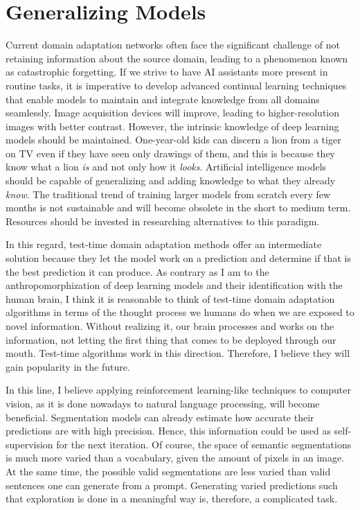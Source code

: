 
\section{Generalizing Models}
Current domain adaptation networks often face the significant challenge of not retaining information about the source domain, leading to a phenomenon known as catastrophic forgetting. If we strive to have AI assistants more present in routine tasks, it is imperative to develop advanced continual learning techniques that enable models to maintain and integrate knowledge from all domains seamlessly. Image acquisition devices will improve, leading to higher-resolution images with better contrast. However, the intrinsic knowledge of deep learning models should be maintained. One-year-old kids can discern a lion from a tiger on TV even if they have seen only drawings of them, and this is because they know what a lion \textit{is} and not only how it \textit{looks}. Artificial intelligence models should be capable of generalizing and adding knowledge to what they already \textit{know}. The traditional trend of training larger models from scratch every few months is not sustainable and will become obsolete in the short to medium term. Resources should be invested in researching alternatives to this paradigm.

In this regard, test-time domain adaptation methods offer an intermediate solution because they let the model work on a prediction and determine if that is the best prediction it can produce. As contrary as I am to the anthropomorphization of deep learning models and their identification with the human brain, I think it is reasonable to think of test-time domain adaptation algorithms in terms of the thought process we humans do when we are exposed to novel information. Without realizing it, our brain processes and works on the information, not letting the first thing that comes to be deployed through our mouth. Test-time algorithms work in this direction. Therefore, I believe they will gain popularity in the future.

In this line, I believe applying reinforcement learning-like techniques to computer vision, as it is done nowadays to natural language processing, will become beneficial. Segmentation models can already estimate how accurate their predictions are with high precision. Hence, this information could be used as self-supervision for the next iteration. Of course, the space of semantic segmentations is much more varied than a vocabulary, given the amount of pixels in an image. At the same time, the possible valid segmentations are less varied than valid sentences one can generate from a prompt. Generating varied predictions such that exploration is done in a meaningful way is, therefore, a complicated task. 